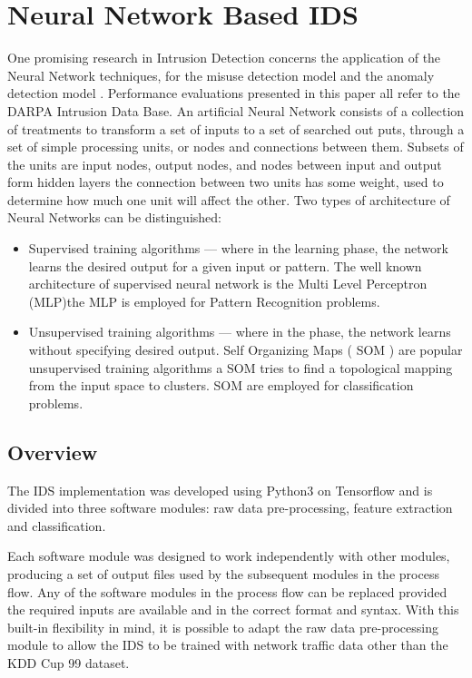 \documentclass[12pt]{article}
\theoremstyle{definition}
\begin{document}
	
	\cleardoublepage
	\section{Neural Network Based IDS}
	\label{sec:nn-based-ids}
		One promising research in Intrusion Detection concerns the application of the Neural Network techniques, for the misuse detection model and the anomaly detection model \cite{Zarpelao2017}. Performance evaluations presented in this
		paper all refer to the DARPA Intrusion Data Base.
		An artificial Neural Network consists of a collection of treatments to transform a set of inputs to a set of searched out puts, through a set of simple processing
		units, or nodes and connections between them. Subsets of the units are input nodes, output nodes, and nodes
		between input and output form hidden layers the connection between two units has some weight, used to determine how much one unit will affect the other. Two types of architecture of Neural Networks can be distinguished:
		\begin{itemize}
			\item Supervised training algorithms --- where in the learning 
			phase, the network learns the desired output for a given input or pattern. The well known architecture of supervised neural network is the Multi Level Perceptron (MLP)the MLP is employed for Pattern 
			Recognition problems.
			\item Unsupervised training algorithms --- where in the phase, the network learns without specifying desired output. Self Organizing Maps ( SOM ) are popular unsupervised training algorithms a SOM tries to find a topological mapping from the input space to clusters. SOM are employed for classification problems.
		\end{itemize}
		
		\subsection{Overview}
		The IDS implementation was developed using Python3 on Tensorflow and is divided
		into three software modules: raw data pre-processing, feature extraction and classification.
		
		Each software module was designed to work independently with other modules,
		producing a set of output files used by the subsequent modules in the process flow. Any of the software modules in the process flow can be replaced provided the required inputs are available and in the correct format and syntax. With this built-in flexibility in mind, it is possible to adapt the raw data pre-processing module to allow the IDS to be trained with network traffic data other than the KDD Cup 99 dataset.
		
\end{document}

